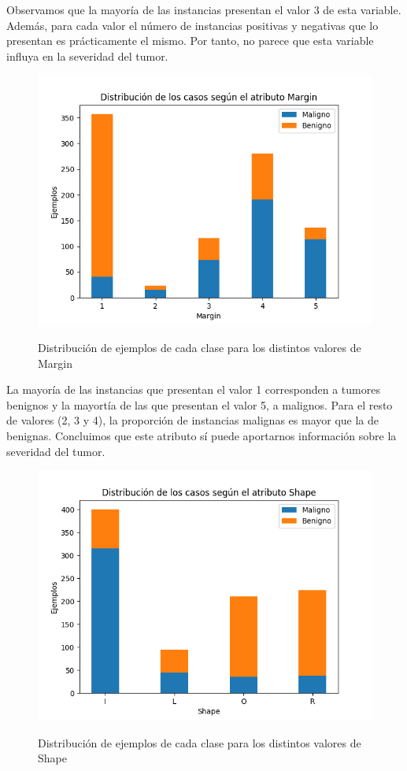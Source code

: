 \documentclass[oneside]{book}
\begin{document}
Observamos que la mayoría de las instancias presentan el valor 3 de
esta variable. Además, para cada valor el número de instancias
positivas y negativas que lo presentan es prácticamente el mismo. Por
tanto, no parece que esta variable influya en la severidad del tumor.

\begin{figure}[H]
  \centering
  \caption{Distribución de ejemplos de cada clase para los distintos valores de Margin}
  \includegraphics[width=115mm]{figures/visualizacion/margin}
  \label{fig:margin}
\end{figure}

La mayoría de las instancias que presentan el valor 1 corresponden a
tumores benignos y la mayortía de las que presentan el valor 5, a
malignos. Para el resto de valores (2, 3 y 4), la proporción de
instancias malignas es mayor que la de benignas. Concluimos que este
atributo sí puede aportarnos información sobre la severidad del tumor.

\begin{figure}[H]
  \centering
  \caption{Distribución de ejemplos de cada clase para los distintos valores de Shape}
  \includegraphics[width=115mm]{figures/visualizacion/shape}
  \label{fig:shape}
\end{figure}
\end{document}
